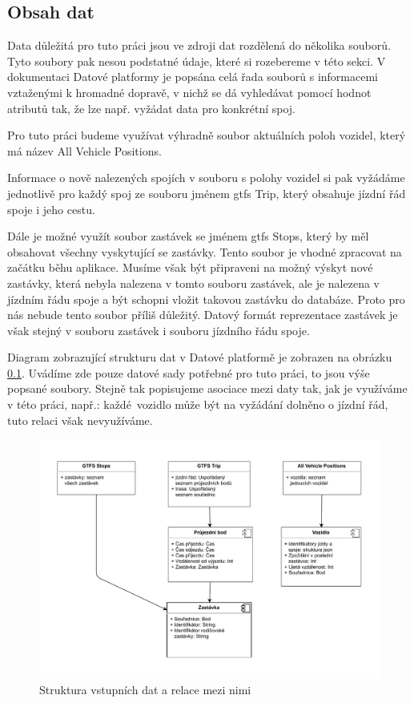 \subsection{Obsah dat}

Data důležitá pro tuto práci jsou ve zdroji dat rozdělená do několika souborů. Tyto soubory pak nesou podstatné údaje, které si rozebereme v této sekci. V dokumentaci Datové platformy je popsána celá řada souborů s informacemi vztaženými k hromadné dopravě, v nichž se dá vyhledávat pomocí hodnot atributů tak, že lze např. vyžádat data pro konkrétní spoj.

\bigbreak

Pro tuto práci budeme využívat výhradně soubor aktuálních poloh vozidel, který má název All Vehicle Positions.

\bigbreak

Informace o nově nalezených spojích v souboru s polohy vozidel si pak vyžádáme jednotlivě pro každý spoj ze souboru jménem \gls{gtfs} Trip, který obsahuje jízdní řád spoje i jeho cestu.

\bigbreak

Dále je možné využít soubor zastávek se jménem \gls{gtfs} Stops, který by měl obsahovat všechny vyskytující se zastávky. Tento soubor je vhodné zpracovat na začátku běhu aplikace. Musíme však být připraveni na možný výskyt nové zastávky, která nebyla nalezena v tomto souboru zastávek, ale je nalezena v jízdním řádu spoje a být schopni vložit takovou zastávku do databáze. Proto pro nás nebude tento soubor příliš důležitý. Datový formát reprezentace zastávek je však stejný v souboru zastávek i souboru jízdního řádu spoje.

\bigbreak

Diagram zobrazující strukturu dat v Datové platformě je zobrazen na obrázku \ref{}. Uvádíme zde pouze datové sady potřebné pro tuto práci, to jsou výše popsané soubory. Stejně tak popisujeme asociace mezi daty tak, jak je využíváme v této práci, např.: každé vozidlo může být na vyžádání dolněno o jízdní řád, tuto relaci však nevyužíváme.

\begin{figure}
	\centering
  \includegraphics[width=\linewidth]{../img/relace_vstupnich_dat}
  \caption{Struktura vstupních dat a relace mezi nimi}
  \label{fig:relace_vstupnich_dat}
\end{figure}

